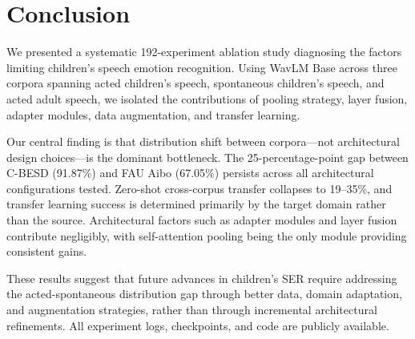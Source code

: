 \section{Conclusion}

We presented a systematic 192-experiment ablation study diagnosing the factors limiting children's speech emotion recognition. Using WavLM Base across three corpora spanning acted children's speech, spontaneous children's speech, and acted adult speech, we isolated the contributions of pooling strategy, layer fusion, adapter modules, data augmentation, and transfer learning.

Our central finding is that distribution shift between corpora---not architectural design choices---is the dominant bottleneck. The 25-percentage-point gap between C-BESD (91.87\%) and FAU Aibo (67.05\%) persists across all architectural configurations tested. Zero-shot cross-corpus transfer collapses to 19--35\%, and transfer learning success is determined primarily by the target domain rather than the source. Architectural factors such as adapter modules and layer fusion contribute negligibly, with self-attention pooling being the only module providing consistent gains.

These results suggest that future advances in children's SER require addressing the acted-spontaneous distribution gap through better data, domain adaptation, and augmentation strategies, rather than through incremental architectural refinements. All experiment logs, checkpoints, and code are publicly available.
